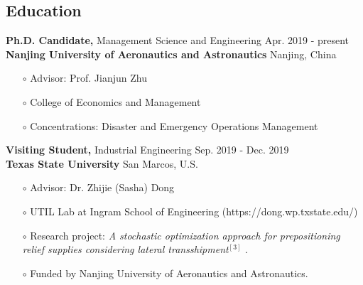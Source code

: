 \documentclass[margin]{res}
\begin{document}
 

\address{
Nanjing University of Aeronautics and Astronautics (NUAA) \\
29 Jiangjun Avenue  \\
Nanjing Jiangsu, 211106 China}
\address{
Email: \hfill guopenghui@outlook.com \\
Homepage: \hfill https://guo.ph \\
Updated: \hfill 2021-04-25 \\[15pt]
}

\begin{resume} 





\section{\sc Education}

{\bf Ph.D. Candidate,}  Management Science and Engineering \hfill Apr. 2019 - present\\
{\bf Nanjing University of Aeronautics and Astronautics} \hfill Nanjing, China
\begin{itemize}  \itemsep -2pt  %
\item[\(\circ\)] Advisor: Prof. Jianjun Zhu
\item[\(\circ\)] College of Economics and Management
\item[\(\circ\)] Concentrations: Disaster and Emergency Operations Management
\end{itemize} \vspace{-.5em}

{\bf Visiting Student,} Industrial Engineering \hfill Sep. 2019 - Dec. 2019\\
{\bf Texas State University} \hfill San Marcos, U.S.
\begin{itemize}   \itemsep -2pt  %
\item[\(\circ\)] Advisor: Dr. Zhijie (Sasha) Dong
\item[\(\circ\)] UTIL Lab at Ingram School of Engineering (https://dong.wp.txstate.edu/)
\item[\(\circ\)] Research project: {\it A stochastic optimization approach for prepositioning relief supplies considering lateral transshipment\(^{[3]}\)} . 
\item[\(\circ\)] Funded by Nanjing University of Aeronautics and Astronautics.
\end{itemize}\vspace{-.5em}


\end{resume}
\end{document}

